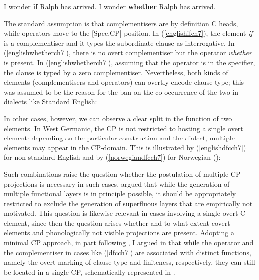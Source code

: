 \ea
\ea I wonder \textbf{if} Ralph has arrived. \label{englishifch7}
\ex I wonder \textbf{whether} Ralph has arrived. \label{englishwhetherch7}
\z
\z

The standard assumption is that complementisers are by definition C heads, while operators move to the [Spec,CP] position. In (\ref{englishifch7}), the element \textit{if} is a complementiser and it types the subordinate clause as interrogative. In (\ref{englishwhetherch7}), there is no overt complementiser but the operator \textit{whether} is present. In (\ref{englishwhetherch7}), assuming that the operator is in the specifier, the clause is typed by a zero complementiser. Nevertheless, both kinds of elements (complementisers and operators) can overtly encode clause type; this was assumed to be the reason for the ban on the co-occurrence of the two in dialects like Standard English:

\z

In other cases, however, we can observe a clear split in the function of two elements. In West Germanic, the CP is not restricted to hosting a single overt element: depending on the particular construction and the dialect, multiple elements may appear in the CP-domain. This is illustrated by (\ref{englishdfcch7}) for non-standard English and by (\ref{norwegiandfcch7}) for Norwegian (\citealt[175]{bacskaiatkaribaudisch2018}):

\ea \label{dfcch7}
\z
\z

Such combinations raise the question whether the postulation of multiple CP projections is necessary in such cases.  argued that while the generation of multiple functional layers is in principle possible, it should be appropriately restricted to exclude the generation of superfluous layers that are empirically not motivated. This question is likewise relevant in cases involving a single overt C-element, since then the question arises whether and to what extent covert elements and phonologically not visible projections are present. Adopting a minimal CP approach, in part following \citet{sobin2002}, I argued in  that while the operator and the complementiser in cases like (\ref{dfcch7}) are associated with distinct functions, namely the overt marking of clause type and finiteness, respectively, they can still be located in a single CP, schematically represented in .

